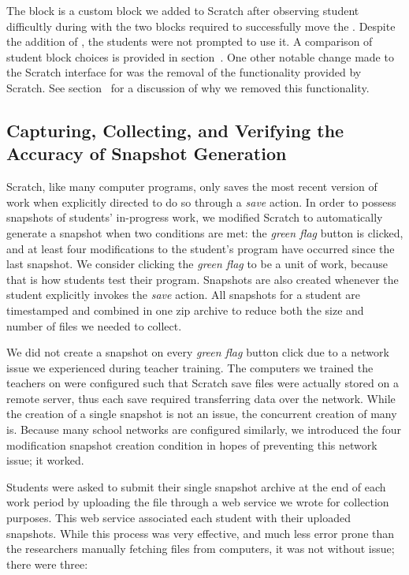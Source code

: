 The \glideto{} block is a custom block we added to Scratch after observing
student difficultly during \sone{} with the two blocks required to successfully
move the \net{}. Despite the addition of \glideto{}, the students were not
prompted to use it. A comparison of student block choices is provided in
section~. One other notable change made to the Scratch
interface for \stwo{} was the removal of the \dce{} functionality provided by
Scratch. See section~ for a discussion of why we removed this
functionality.

\subsection{Capturing, Collecting, and Verifying the Accuracy of Snapshot Generation}
Scratch, like many computer programs, only saves the most recent version of
work when explicitly directed to do so through a \emph{save} action. In order
to possess snapshots of students' in-progress work, we modified Scratch to
automatically generate a snapshot when two conditions are met: the \emph{green
  flag} button is clicked, and at least four modifications to the student's
program have occurred since the last snapshot. We consider clicking the
\emph{green flag} to be a unit of work, because that is how students test their
program. Snapshots are also created whenever the student explicitly invokes the
\emph{save} action. All snapshots for a student are timestamped and combined in
one zip archive to reduce both the size and number of files we needed to
collect.

We did not create a snapshot on every \emph{green flag} button click due to a
network issue we experienced during teacher training. The computers we trained
the teachers on were configured such that Scratch save files were actually
stored on a remote server, thus each save required transferring data over the
network. While the creation of a single snapshot is not an issue, the
concurrent creation of many is. Because many school networks are configured
similarly, we introduced the four modification snapshot creation condition in
hopes of preventing this network issue; it worked.

Students were asked to submit their single snapshot archive at the end of each
work period by uploading the file through a web service we wrote for collection
purposes. This web service associated each student with their uploaded
snapshots. While this process was very effective, and much less error prone
than the researchers manually fetching files from computers, it was not without
issue; there were three:

